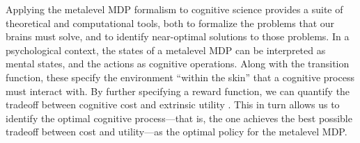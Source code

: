 Applying the metalevel MDP formalism to cognitive science provides a suite of theoretical and computational tools, both to formalize the problems that our brains must solve, and to identify near-optimal solutions to those problems. In a psychological context, the states of a metalevel MDP can be interpreted as mental states, and the actions as cognitive operations. Along with the transition function, these specify the environment ``within the skin'' that a cognitive process must interact with. By further specifying a reward function, we can quantify the tradeoff between cognitive cost and extrinsic utility . This in turn allows us to identify the optimal cognitive process---that is, the one achieves the best possible tradeoff between cost and utility---as the optimal policy for the metalevel MDP.